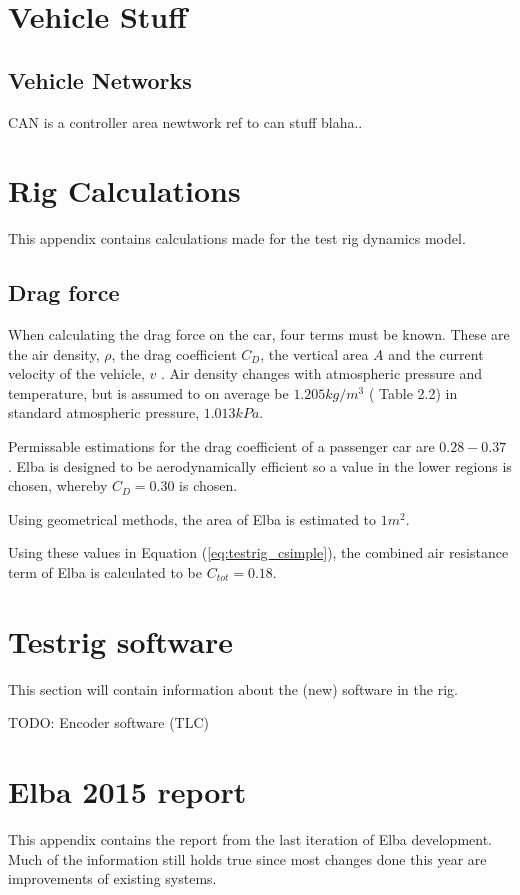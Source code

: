 \chapter{Vehicle Stuff} \label{appA}

\section{Vehicle Networks}
CAN is a controller area newtwork ref to can stuff blaha..

\chapter{Rig Calculations} \label{app:rigdata}
This appendix contains calculations made for the test rig dynamics model. 

\section*{Drag force}
When calculating the drag force on the car, four terms must be known.
These are the air density, $\rho$, the drag coefficient $C_D$, the vertical area
$A$ and the current velocity of the vehicle, $v$ \cite{nakayama2002}. Air
density changes with atmospheric pressure and temperature, but is assumed to on
average be $1.205\si{kg/m^3}$ (\cite{nakayama2002} Table 2.2) in standard
atmospheric pressure, $1.013\si{kPa}$. 

Permissable estimations for the drag coefficient of a passenger car are
$0.28-0.37$ \cite{nakayama2002}. Elba is designed to be aerodynamically
efficient so a value in the lower regions is chosen, whereby $C_D = 0.30$ is
chosen.

Using geometrical methods, the area of Elba is estimated to $1\si{m^2}$.

Using these values in Equation (\ref{eq:testrig_csimple}), the combined air
resistance term of Elba is calculated to be $C_{tot} = 0.18$.

\chapter{Testrig software}
This section will contain information about the (new) software in the rig.

TODO: Encoder software (TLC)


\chapter{Elba 2015 report} \label{app:elba2015}
This appendix contains the report from the last iteration of Elba development.
Much of the information still holds true since most changes done this year are
improvements of existing systems.

